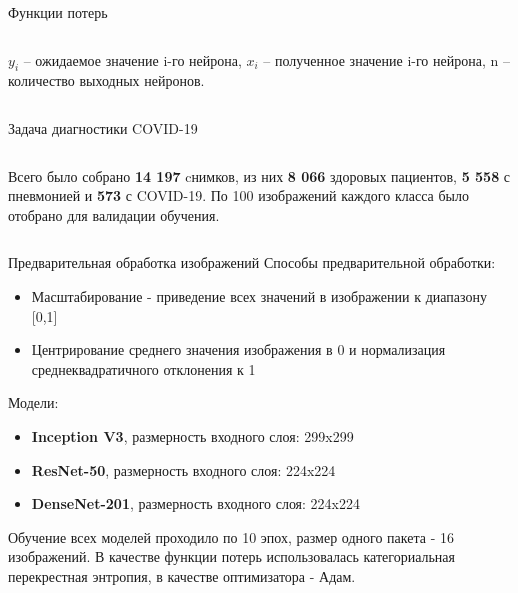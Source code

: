 \documentclass[aspectratio=169]{beamer}
\begin{document}
\begin{frame}{Функции потерь}
    
    \begin{columns}[T]
        \begin{column}{.8\paperwidth}
            $y_i$ – ожидаемое значение i-го нейрона, $x_i$ – полученное значение i-го нейрона, n – количество выходных нейронов.
        \end{column}
    \end{columns}   
\end{frame}

\begin{frame}{Задача диагностики COVID-19}
    \begin{columns}[T]
        \begin{column}{.8\paperwidth}            
            Всего было собрано \textbf{14 197} cнимков, из них \textbf{8 066} здоровых пациентов, \textbf{5 558} с пневмонией и \textbf{573} с COVID-19. По 100 изображений каждого класса было отобрано для валидации обучения.    
        \end{column}
    \end{columns}  
\end{frame}

\begin{frame}{Предварительная обработка изображений}
    Способы предварительной обработки:
    \begin{itemize}    
        \item Масштабирование - приведение всех значений в изображении к диапазону [0,1]
        \item Центрирование среднего значения изображения в 0 и нормализация среднеквадратичного отклонения к 1
    \end{itemize}    
    Модели:
    \begin{itemize}
        \item \textbf{Inception V3}, размерность входного слоя: 299x299
        \item \textbf{ResNet-50}, размерность входного слоя: 224x224
        \item \textbf{DenseNet-201}, размерность входного слоя:  224x224
    \end{itemize} 
    Обучение всех моделей проходило по 10 эпох, размер одного пакета - 16 изображений. В качестве функции потерь использовалась категориальная перекрестная энтропия, в качестве оптимизатора - Адам. 
\end{frame}
\end{document}
